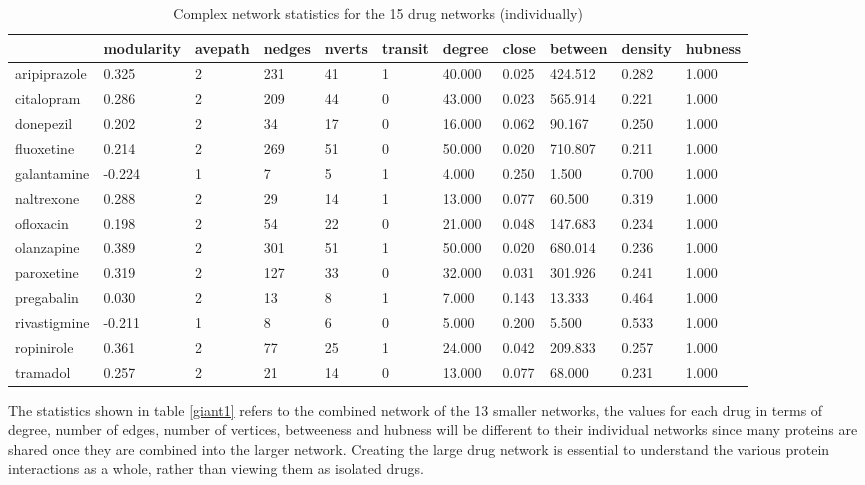 \documentclass[preprint,12pt]{elsarticle}
\begin{document}
\begin{table}[h]
\centering \caption{Complex network statistics for the 15 drug networks (individually) } \label{thirteen}
\scriptsize
\begin{tabular}{lllllllllll}
  \hline
 & modularity & avepath & nedges & nverts & transit & degree & close & between & density & hubness \\ 
  \hline
aripiprazole & 0.325 & 2 & 231 &   41 & 1 & 40.000 & 0.025 & 424.512 & 0.282 & 1.000 \\ 
  citalopram & 0.286 & 2 & 209 &   44 & 0 & 43.000 & 0.023 & 565.914 & 0.221 & 1.000 \\ 
  donepezil & 0.202 & 2 & 34 &   17 & 0 & 16.000 & 0.062 & 90.167 & 0.250 & 1.000 \\ 
  fluoxetine & 0.214 & 2 & 269 &   51 & 0 & 50.000 & 0.020 & 710.807 & 0.211 & 1.000 \\ 
  galantamine & -0.224 & 1 & 7 &    5 & 1 & 4.000 & 0.250 & 1.500 & 0.700 & 1.000 \\ 
  naltrexone & 0.288 & 2 & 29 &   14 & 1 & 13.000 & 0.077 & 60.500 & 0.319 & 1.000 \\ 
  ofloxacin & 0.198 & 2 & 54 &   22 & 0 & 21.000 & 0.048 & 147.683 & 0.234 & 1.000 \\ 
  olanzapine & 0.389 & 2 & 301 &   51 & 1 & 50.000 & 0.020 & 680.014 & 0.236 & 1.000 \\ 
  paroxetine & 0.319 & 2 & 127 &   33 & 0 & 32.000 & 0.031 & 301.926 & 0.241 & 1.000 \\ 
  pregabalin & 0.030 & 2 & 13 &    8 & 1 & 7.000 & 0.143 & 13.333 & 0.464 & 1.000 \\ 
  rivastigmine & -0.211 & 1 & 8 &    6 & 0 & 5.000 & 0.200 & 5.500 & 0.533 & 1.000 \\ 
  ropinirole & 0.361 & 2 & 77 &   25 & 1 & 24.000 & 0.042 & 209.833 & 0.257 & 1.000 \\ 
  tramadol & 0.257 & 2 & 21 &   14 & 0 & 13.000 & 0.077 & 68.000 & 0.231 & 1.000 \\ 
   \hline
\end{tabular}
\end{table}
\normalsize

The statistics shown in table \ref{giant1} refers to the combined network of the 13 smaller networks, the values for each drug in terms of  degree, number of edges, number of vertices, betweeness and hubness will be different to their individual networks since many proteins are shared once they are combined into the larger network. Creating the large drug network is essential to understand the various protein interactions as a whole, rather than viewing them as isolated drugs.
\end{document}
